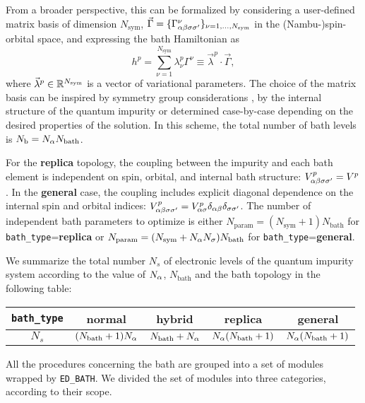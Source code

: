 \documentclass[edipack_sp.tex]{subfiles}
\begin{document}
From a broader perspective, this can be formalized by considering  
a user-defined matrix basis of dimension $N_\mathrm{sym}$, 
$\vec{\Gamma}=\{ \Gamma^\nu_{\alpha\beta\sigma\sigma'} \}_{\nu=1,\dots,N_\mathrm{sym}}$ in the (Nambu-)spin-orbital
space, and expressing the bath Hamiltonian as
$$
h^p = \sum_{\nu=1}^{N_\mathrm{sym}} \lambda^p_\nu
\Gamma^\nu\equiv \vec{\lambda}^p\cdot \vec{\Gamma},
\label{eq:replica_bath_sym}
$$
where $\vec{\lambda}^p\in\mathbb{R}^{N_\mathrm{sym}}$ is a vector of variational parameters. 
The choice of the matrix basis can be inspired by symmetry group considerations \cite{Koch2008PRB,Senechal2010PRB}, by the internal structure
of the quantum impurity or determined
case-by-case depending on the desired properties of the solution.
In this scheme, the total number of bath levels is  $N_\mathrm{b}
= N_\alpha N_\mathrm{bath}$. 


For the {\bf replica} topology, the coupling between the impurity 
and each bath element is independent on spin, orbital, and internal 
bath structure: $V^p_{\alpha\beta\sigma\sigma'} = V^p$.
In the {\bf general} case, the coupling includes explicit 
diagonal
dependence on the internal spin and orbital indices: $V^p_{\alpha\beta\sigma\sigma'}
= V^p_{\alpha\sigma}\delta_{\alpha\beta}\delta_{\sigma\sigma'}$. 
%
The number of independent bath parameters to optimize is either 
$N_\mathrm{param} = (N_\mathrm{sym}+1)N_\mathrm{bath}$ for {\tt bath\_type}={\bf replica} or 
$N_\mathrm{param} = (N_\mathrm{sym}+N_\alpha N_\sigma)N_\mathrm{bath}$ for {\tt bath\_type}={\bf general}.

We summarize the total number $N_s$ of electronic levels of the quantum impurity system according to the value of $N_\alpha$, $N_\mathrm{bath}$ and the bath topology in the following table:
\begin{center}
\begin{tabular}{ |c||c|c|c|c| } 
 \hline     
{\tt bath\_type} & {\bf normal} & {\bf hybrid} & {\bf replica} & {\bf general}\\
 \hline 
  \hline    
  $N_s$ & 
 $(N_\mathrm{bath}+1)N_\alpha$ & 
 $N_\mathrm{bath}+N_\alpha$ & 
 $N_\alpha(N_\mathrm{bath}+1)$ & 
 $N_\alpha(N_\mathrm{bath}+1)$  \\ 
 \hline
\end{tabular}
\end{center}

\vspace{2mm}
All the procedures concerning the bath
are grouped into a set of modules wrapped by {\tt ED\_BATH}. 
We divided the set of modules into three categories, according to their scope.
\end{document}
